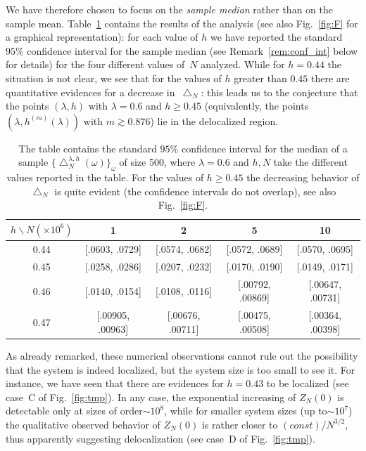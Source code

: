 \documentclass[reqno,11pt]{amsart}
\numberwithin{equation}{section}
\newcommand{\go}{\omega}
\newcommand{\gl}{\lambda}
\begin{document}
We have therefore chosen 
to focus on the \textsl{sample median} rather than on the sample mean. Table~\ref{tbl:F} contains the results of the analysis (see also Fig.~\ref{fig:F} for a graphical representation): for each value of $h$ we have reported the standard $95\%$ confidence interval for the sample median (see Remark~\ref{rem:conf_int} below for details) for the four different values of~$N$ analyzed. While for $h=0.44$ the situation is not clear, we see that for the values of $h$ greater than $0.45$ there are quantitative evidences for a decrease in~$\bigtriangleup_{N}$: this leads us to the conjecture that the points $(\gl,h)$ with $\gl=0.6$ and $h\ge 0.45$ (equivalently, the points $(\gl,h^{(m)}(\gl))$ with $m \gtrsim 0.876$) lie in the delocalized region.

\begin{table}[h]
\begin{center}
\begin{tabular}{|c||c|c|c|c|}
\hline
$h \backslash N(\times 10^6) $ & 1 & 2 & 5 & 10\\
\hline
\hline
0.44 & [.0603, .0729] & [.0574, .0682] & [.0572, .0689] & [.0570, .0695] \\
\hline
0.45 & [.0258, .0286] & [.0207, .0232] & [.0170, .0190] & [.0149, .0171] \\
\hline
0.46 & [.0140, .0154] & [.0108, .0116] & [.00792, .00869] & [.00647, .00731] \\
\hline
0.47 & [.00905, .00963] & [.00676, .00711] & [.00475, .00508] & [.00364, .00398] \\
\hline
\end{tabular}
\end{center}
\caption{ \label{tbl:F}
The table contains the standard $95\%$ confidence interval for the median of a sample $\{\bigtriangleup _N^{\gl,h}(\go)\}_{\go}$ of size 500, where $\gl=0.6$ and $h,N$ take the different values reported in the table. For the values of $h \ge 0.45$ the decreasing behavior of $\bigtriangleup_{N}$ is quite evident (the confidence intervals do not overlap), see also Fig.~\ref{fig:F}.}
\end{table}

As already remarked, these numerical observations cannot rule out the possibility that the system is indeed localized, but the system size is too small to see it. For instance, we have seen that there are evidences for $h=0.43$ to be localized (see case~C of Fig.~\ref{fig:tmp}).
In any case, the exponential increasing of $Z_N(0)$ is detectable only at sizes of order$\sim 10^8$, while for smaller system sizes (up to$\sim 10^7$) the qualitative observed behavior of $Z_N(0)$ is rather closer to $(const)/N^{3/2}$, thus apparently suggesting delocalization (see case~D of Fig.~\ref{fig:tmp}).
\end{document}
